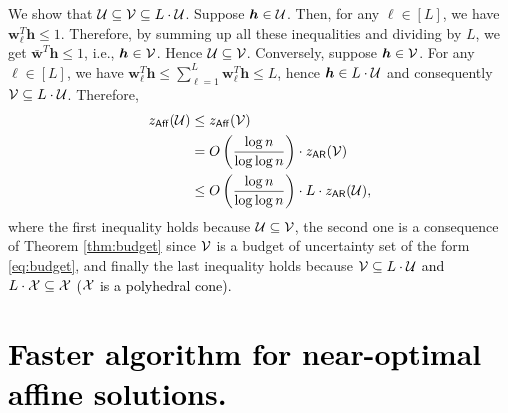 \documentclass[moor]{informs1}              %
\newcommand{\mb}[1]{\ensuremath{\boldsymbol{#1}}}
\newcommand*{\red}{\textcolor{black}}
\begin{document}
We show that ${\cal U }  \subseteq {\cal V} \subseteq  L \cdot {\cal U }$.  Suppose $ \mb h \in {\cal U}$. Then, for any ${\ell} \in [L]$, we have $ \mb w_{\ell}^T \mb h \leq 1$. Therefore, by summing up all these inequalities and dividing by $L$, we get $\mb{\bar w}^T \mb h \leq 1$, i.e., $\mb h \in {\cal V}$. Hence ${\cal U }  \subseteq {\cal V}$. Conversely, suppose $ \mb h \in {\cal V}$. For any ${\ell} \in [L]$, we have $ \mb w_{\ell}^T \mb h \leq  \sum_{\ell=1}^L   \mb w_{\ell}^T \mb h   \leq L$, hence $\mb h \in L \cdot {\cal U}$ and consequently ${\cal V} \subseteq  L \cdot {\cal U }$. Therefore,
\begin{align*}
z_{\sf Aff}({\cal U}) & \leq    z_{\sf Aff}( {\cal V}) \\
&= O \left( \frac{\log n}{\log \log n} \right) \cdot   z_{\sf AR}( {\cal V}) \\
& \leq  O\left( \frac{\log n}{\log \log n} \right) \cdot L \cdot z_{\sf AR}({\cal U}),
\end{align*}
where the first inequality holds because $ {\cal U} \subseteq {\cal V}$, the second one is a consequence of Theorem \ref{thm:budget} since ${\cal V}$ is a budget of uncertainty set of the form \eqref{eq:budget}, and finally the last inequality holds because $ {\cal V} \subseteq   L \cdot     {\cal U}$ \red{and  $ L \cdot\cal X \subseteq  {\cal X}$ ($\cal X$ is a polyhedral cone).}

\hfill
\Halmos
\endproof






\section{\red{Faster algorithm for near-optimal affine solutions.}} \label{sec:numerical}
\end{document}
